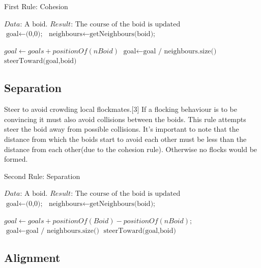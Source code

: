 \documentclass[12pt]{article}
\begin{document}
\begin{algorithm}
\caption{First Rule: Cohesion}\label{euclid}
\begin{algorithmic}[1]
\State $\textit{Data:   } \text{A boid.}$
\State $\textit{Result:   } \text{The course of the boid is updated}$
\\
\State $\text{goal} \gets \text{(0,0);}$
\State $\text{neighbours} \gets \text{getNeighbours(boid);}$

    \State $ goal \gets goals + positionOf(nBoid)$
\Endfor
\State $\text{goal} \gets \text{goal / neighbours.size()}$
\State $\text{steerToward(goal,boid)}$
\end{algorithmic}

\end{algorithm}

\subsection{Separation}

Steer to avoid crowding local flockmates.[3] If a flocking behaviour is to be convincing it must also avoid collisions between the boids. This rule attempts steer the boid away from possible collisions. It's important to note that the distance from which the boids start to avoid each other must be less than the distance from each other(due to the cohesion rule). Otherwise no flocks would be formed.

\begin{algorithm}
\caption{Second Rule: Separation}\label{euclid}
\begin{algorithmic}[1]
\State $\textit{Data:   } \text{A boid.}$
\State $\textit{Result:   } \text{The course of the boid is updated}$
\\
\State $\text{goal} \gets \text{(0,0);}$
\State $\text{neighbours} \gets \text{getNeighbours(boid);}$

    \State $ goal \gets goals + positionOf(Boid) - positionOf(nBoid);$
\Endfor
\State $\text{goal} \gets \text{goal / neighbours.size()}$
\State $\text{steerToward(goal,boid)}$
\end{algorithmic}

\end{algorithm}

\subsection{Alignment}
\end{document}
